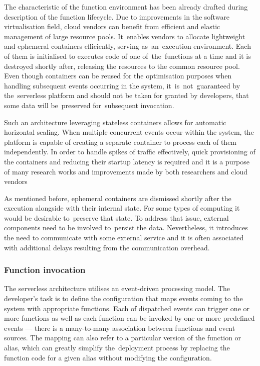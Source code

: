 The characteristic of the function environment has been already drafted during description of the function lifecycle. Due to improvements in the software virtualisation field, cloud vendors can benefit from efficient and elastic management of large resource pools. It~enables vendors to allocate lightweight and ephemeral containers efficiently, serving as~an~execution environment. Each of them is initialised to executes code of one of~the~functions at a time and it is destroyed shortly after, releasing the resources to the common resource pool. Even though containers can be reused for the optimisation purposes when handling subsequent events occurring in the system, it~is~not~guaranteed by the~serverless platform and should not be taken for granted by developers, that some data will be~preserved for~subsequent invocation.

Such an architecture leveraging stateless containers allows for automatic horizontal scaling. When multiple concurrent events occur within the system, the platform is capable of creating a separate container to process each of them independently. In order to handle spikes of traffic effectively, quick provisioning of the containers and reducing their startup latency is required and it is a purpose of many research works and improvements made by both researchers and cloud vendors

As mentioned before, ephemeral containers are dismissed shortly after the execution alongside with their internal state. For some types of computing it would be desirable to~preserve that state. To address that issue, external components need to be involved to~persist the data. Nevertheless, it introduces the need to communicate with some external service and it is often associated with additional delays resulting from the communication overhead.

\subsubsection{Function invocation} \label{section:serverless-function-invocation}

The serverless architecture utilises an event-driven processing model. The developer's task is to define the configuration that maps events coming to the system with appropriate functions. Each of dispatched events can trigger one or more functions as well as each function can be invoked by one or more predefined events --- there is a many-to-many association between functions and event sources. The mapping can also refer to a particular version of the function or alias, which can greatly simplify the~deployment process by replacing the function code for a given alias without modifying the configuration.

